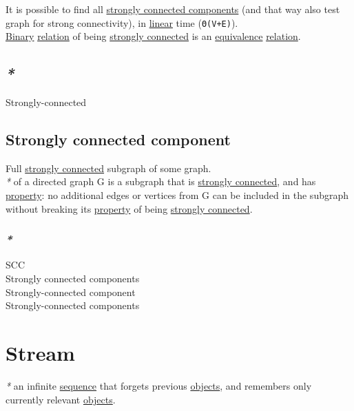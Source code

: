 \documentclass[a4paper,14pt,oneside]{book}
\begin{document}
It is possible to find all \hyperref[orge087993]{strongly connected components} (and that way also test graph for strong connectivity), in \hyperref[orgdbc19f4]{linear} time (\texttt{Θ(V+E)}).\\

\hyperref[orgd0575cd]{Binary} \hyperref[org70d7aba]{relation} of being \hyperref[orga79f50b]{strongly connected} is an \hyperref[org663eda7]{equivalence} \hyperref[org70d7aba]{relation}.\\

\section{\emph{*}}
\label{sec:orgc7971cb}

\label{orgd9f34b0}Strongly-connected\\

\section{\label{org8090843}Strongly connected component}
\label{sec:org80c30c9}
Full \hyperref[orga79f50b]{strongly connected} subgraph of some graph.\\

\emph{*} of a directed graph G is a subgraph that is \hyperref[orga79f50b]{strongly connected}, and has \hyperref[org91a1c9f]{property}: no additional edges or vertices from G can be included in the subgraph without breaking its \hyperref[org91a1c9f]{property} of being \hyperref[orga79f50b]{strongly connected}.\\

\subsection{\emph{*}}
\label{sec:org7fffe48}

\label{org4ec528e}SCC\\
\label{orge087993}Strongly connected components\\
\label{org6d7f917}Strongly-connected component\\
\label{org08eab13}Strongly-connected components\\

\chapter{\label{org49c597a}Stream}
\label{sec:org7d97fe1}
\emph{*} an infinite \hyperref[org49f8153]{sequence} that forgets previous \hyperref[org22f7883]{objects}, and remembers only currently relevant \hyperref[org22f7883]{objects}.\\
\end{document}
